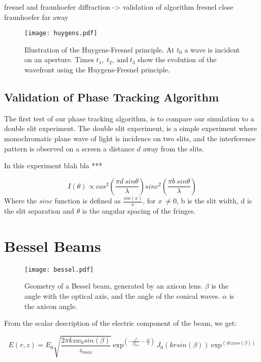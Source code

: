 fresnel and fraunhoefer diffraction -> validation of algorithm
fresnel close
fraunhoefer far away

\begin{figure}[!ht]
    \centering
    \texttt{[image: huygens.pdf]}
    \caption{Illustration of the Huygens-Fresnel principle. At $t_0$ a wave is incident on an aperture. Times $t_1,\ t_2,\ \text{and}\ t_3$ show the evolution of the wavefront using the Huygens-Fresnel principle.}
    \label{fig:huygensillis}
\end{figure}

\subsection{Validation of Phase Tracking Algorithm}

The first test of our phase tracking algorithm, is to compare our simulation to a double slit experiment.
The double slit experiment, is a simple experiment where monochromatic plane wave of light is incidence on two slits, and the interference pattern is observed on a screen a distance $d$ away from the slits.

In this experiment blah bla ***

\begin{equation}
    I(\theta) \propto cos^2\left(\frac{\pi d\ sin \theta}{\lambda}\right)sinc^2\left(\frac{\pi b\ sin\theta}{\lambda}\right)
\end{equation}
Where the $sinc$ function is defined as $\tfrac{sin(x)}{x}$, for $x\ \neq 0$, b is the slit width, d is the slit separation and $\theta$ is the angular spacing of the fringes.

\section{Bessel Beams}


\begin{figure}[!ht]
    \centering
    \texttt{[image: bessel.pdf]}
    \caption{Geometry of a Bessel beam, generated by an axicon lens. $\beta$ is the angle with the optical axis, and the angle of the conical waves. $\alpha$ is the axicon angle.}
    \label{fig:besselgeo}
\end{figure}

From the scalar description of the electric component of the beam, we get:

\begin{equation}
    E(r,z)=E_0\sqrt{\frac{2\pi k z w_0sin(\beta)}{z_{max}}}\ \text{exp}^{\left(-\frac{z^2}{z_{max}^2}-\frac{i\pi}{4}\right)}\ J_0\left(krsin(\beta)\right)\ \text{exp}^{\left(ikzcos(\beta)\right)}
    \label{eqn:besselEfield}
\end{equation}

